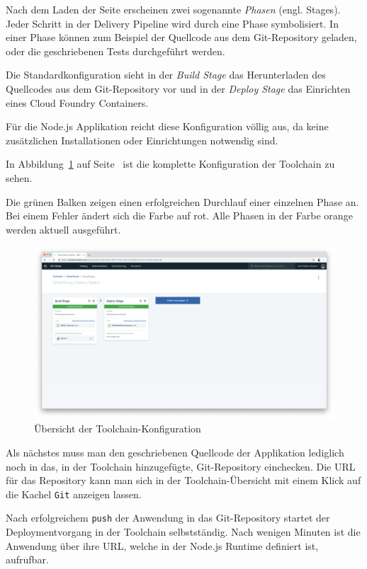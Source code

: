 Nach dem Laden der Seite erscheinen zwei sogenannte \textit{Phasen} (engl. Stages). Jeder Schritt in der Delivery
Pipeline wird durch eine Phase symbolisiert. In einer Phase können zum Beispiel der Quellcode aus dem Git-Repository
geladen, oder die geschriebenen Tests durchgeführt werden.

Die Standardkonfiguration sieht in der \textit{Build Stage} das Herunterladen des Quellcodes aus dem Git-Repository vor
und in der \textit{Deploy Stage} das Einrichten eines Cloud Foundry Containers.

Für die Node.js Applikation reicht diese Konfiguration völlig aus, da keine zusätzlichen Installationen oder
Einrichtungen notwendig sind.

In Abbildung~\ref{fig:umsetzung_toolchain_pipeline} auf Seite~\pageref{fig:umsetzung_toolchain_pipeline} ist die
komplette Konfiguration der Toolchain zu sehen.

Die grünen Balken zeigen einen erfolgreichen Durchlauf einer einzelnen Phase an. Bei einem Fehler ändert sich die Farbe
auf rot. Alle Phasen in der Farbe orange werden aktuell ausgeführt.

\begin{figure}[h]
    \centering
    \includegraphics[width=\textwidth]{images/kapitel_3/toolchain_pipeline.png}
    \caption{Übersicht der Toolchain-Konfiguration}
    \label{fig:umsetzung_toolchain_pipeline}
\end{figure}

Als nächstes muss man den geschriebenen Quellcode der Applikation lediglich noch in das, in der Toolchain hinzugefügte,
Git-Repository einchecken. Die URL für das Repository kann man sich in der Toolchain-Übersicht mit einem Klick auf die
Kachel \texttt{Git} anzeigen lassen.

Nach erfolgreichem \texttt{push} der Anwendung in das Git-Repository startet der Deploymentvorgang in der Toolchain
selbstständig. Nach wenigen Minuten ist die Anwendung über ihre URL, welche in der Node.js Runtime definiert ist,
aufrufbar.

